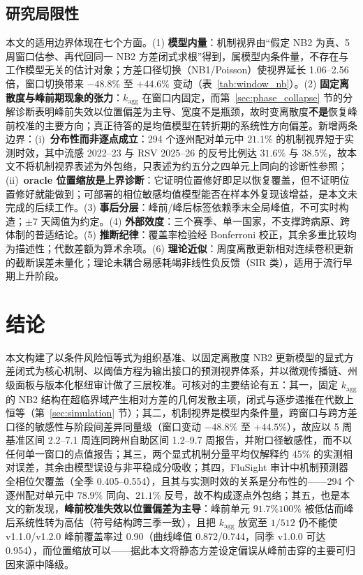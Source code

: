 \documentclass[10pt,UTF8,a4paper,zihao=-4]{ctexart}
\theoremstyle{plain}
\theoremstyle{definition}
\theoremstyle{remark}
\begin{document}
\subsection{研究局限性}\label{sec:limitations}

本文的适用边界体现在七个方面。(1) \textbf{模型内量}：机制视界由“假定 NB2 为真、5 周窗口估参、再代回同一 NB2 方差闭式求根”得到，属模型内条件量，不存在与工作模型无关的估计对象；方差口径切换（NB1/Poisson）使视界延长 1.06--2.56 倍，窗口切换带来 $-48.8\%$ 至 $+44.6\%$ 变动（表~\ref{tab:window_nb}）。(2) \textbf{固定离散度与峰前期现象的张力}：$k_{\text{agg}}$ 在窗口内固定，而第~\ref{sec:phase_collapse} 节的分解诊断表明峰前失效以位置偏差为主导、宽度不是瓶颈，故时变离散度\textbf{不是}恢复峰前校准的主要方向；真正待答的是均值模型在转折期的系统性方向偏差。新增两条边界：(i)~\textbf{分布性而非逐点成立}：294 个逐州配对单元中 $21.1\%$ 的机制视界短于实测时效，其中流感 2022--23 与 RSV 2025--26 的反号比例达 $31.6\%$ 与 $38.5\%$，故本文不将机制视界表述为外包络，只表述为约五分之四单元上同向的诊断性参照；(ii)~\textbf{oracle 位置缩放是上界诊断}：它证明位置修好即足以恢复覆盖，但不证明位置修好就能做到；可部署的相位敏感均值模型能否在样本外复现该增益，是本文未完成的后续工作。(3) \textbf{事后分层}：峰前/峰后标签依赖季末全局峰值，不可实时构造；$\pm 7$ 天阈值为约定。(4) \textbf{外部效度}：三个赛季、单一国家，不支撑跨病原、跨体制的普适结论。(5) \textbf{推断纪律}：覆盖率检验经 Bonferroni 校正，其余多重比较均为描述性；代数差额为算术余项。(6) \textbf{理论近似}：周度离散更新相对连续卷积更新的截断误差未量化；理论未耦合易感耗竭非线性负反馈（SIR 类），适用于流行早期上升阶段。

\section{结论}\label{sec:conclusion}

本文构建了以条件风险恒等式为组织基准、以固定离散度 NB2 更新模型的显式方差闭式为核心机制、以阈值方程为输出接口的预测视界体系，并以微观传播链、州级面板与版本化枢纽审计做了三层校准。可核对的主要结论有五：其一，固定 $k_{\text{agg}}$ 的 NB2 结构在超临界域产生相对方差的几何发散主项，闭式与逐步递推在代数上恒等（第~\ref{sec:simulation} 节）；其二，机制视界是模型内条件量，跨窗口与跨方差口径的敏感性与阶段间差异同量级（窗口变动 $-48.8\%$ 至 $+44.5\%$），故应以 5 周基准区间 2.2--7.1 周连同跨州自助区间 1.2--9.7 周报告，并附口径敏感性，而不以任何单一窗口的点值报告；其三，两个显式机制分量平均仅解释约 45\% 的实测相对误差，其余由模型误设与非平稳成分吸收；其四，FluSight 审计中机制预测器全相位欠覆盖（全季 0.405--0.554），且其与实测时效的关系是分布性的——294 个逐州配对单元中 $78.9\%$ 同向、$21.1\%$ 反号，故不构成逐点外包络；其五，也是本文的新发现，\textbf{峰前校准失效以位置偏差为主导}：峰前单元 $91.7\%$\text{--}$100\%$ 被低估而峰后系统性转为高估（符号结构跨三季一致），且把 $k_{\text{agg}}$ 放宽至 $1/512$ 仍不能使 v1.1.0/v1.2.0 峰前覆盖率过 0.90（曲线峰值 0.872/0.744，同季 v1.0.0 可达 0.954），而位置缩放可以——据此本文将静态方差设定偏误从峰前击穿的主要可归因来源中降级。
\end{document}
